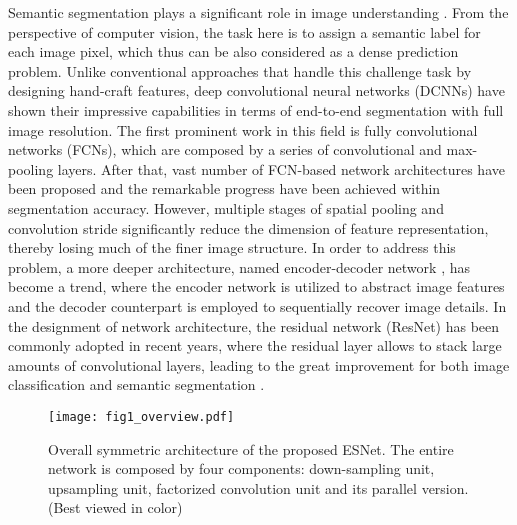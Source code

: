 \documentclass[runningheads]{llncs}
\begin{document}
Semantic segmentation plays a significant role in image understanding \cite{krizhevsky2012imagenet,he2016deep,girshick2014rich}. From the perspective of computer vision, the task here is to assign a semantic label for each image pixel, which thus can be also considered as a dense prediction problem. Unlike conventional approaches that handle this challenge task by designing hand-craft features, deep convolutional neural networks (DCNNs) have shown their impressive capabilities in terms of end-to-end segmentation with full image resolution. The first prominent work in this field is fully convolutional networks (FCNs)\cite{long2017fully}, which are composed by a series of convolutional and max-pooling layers. After that, vast number of FCN-based network architectures \cite{Chen2016deeplab,zhao2017pyramid,xiao2017not} have been proposed and the remarkable progress have been achieved within segmentation accuracy. However, multiple stages of spatial pooling and convolution stride significantly reduce the dimension of feature representation, thereby losing much of the finer image structure. In order to address this problem, a more deeper architecture, named encoder-decoder network \cite{Badrinarayanan2015Segnet,Guosheng2017RefineNet,noh2015learning}, has become a trend, where the encoder network is utilized to abstract image features and the decoder counterpart is employed to sequentially recover image details. In the designment of network architecture, the residual network (ResNet) \cite{he2016deep} has been commonly adopted in recent years, where the residual layer allows to stack large amounts of convolutional layers, leading to the great improvement for both image classification \cite{krizhevsky2012imagenet,he2016deep,szegedy2015going} and semantic segmentation \cite{chao2017large,exploring2018lin,cong2019can}.

\begin{figure*}[!t]
\centerline{\texttt{[image: fig1\_overview.pdf]}}
\caption{Overall symmetric architecture of the proposed ESNet. The entire network is composed by four components: down-sampling unit, upsampling unit, factorized convolution unit and its parallel version. (Best viewed in color)} \label{fig:Overview}
\end{figure*}
\end{document}
